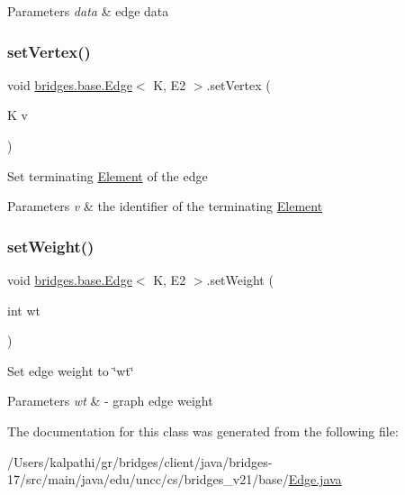 \begin{DoxyParams}{Parameters}
{\em data} & edge data \\
\hline
\end{DoxyParams}
\mbox{\label{classbridges_1_1base_1_1_edge_a02684f6a156a82d431d5d82cf4f943a2}} 
\subsubsection{\texorpdfstring{set\+Vertex()}{setVertex()}}
{\footnotesize\ttfamily void \mbox{\hyperlink{classbridges_1_1base_1_1_edge}{bridges.\+base.\+Edge}}$<$ K, E2 $>$.set\+Vertex (\begin{DoxyParamCaption}\item[{K}]{v }\end{DoxyParamCaption})}

Set terminating \mbox{\hyperlink{classbridges_1_1base_1_1_element}{Element}} of the edge


\begin{DoxyParams}{Parameters}
{\em v} & the identifier of the terminating \mbox{\hyperlink{classbridges_1_1base_1_1_element}{Element}} \\
\hline
\end{DoxyParams}
\mbox{\label{classbridges_1_1base_1_1_edge_ad60cdae7be19065d528432c0c55f7b8c}} 
\subsubsection{\texorpdfstring{set\+Weight()}{setWeight()}}
{\footnotesize\ttfamily void \mbox{\hyperlink{classbridges_1_1base_1_1_edge}{bridges.\+base.\+Edge}}$<$ K, E2 $>$.set\+Weight (\begin{DoxyParamCaption}\item[{int}]{wt }\end{DoxyParamCaption})}

Set edge weight to \char`\"{}wt\char`\"{}


\begin{DoxyParams}{Parameters}
{\em wt} & -\/ graph edge weight \\
\hline
\end{DoxyParams}


The documentation for this class was generated from the following file\+:\begin{DoxyCompactItemize}
\item 
/\+Users/kalpathi/gr/bridges/client/java/bridges-\/17/src/main/java/edu/uncc/cs/bridges\+\_\+v21/base/\mbox{\hyperlink{_edge_8java}{Edge.\+java}}\end{DoxyCompactItemize}
